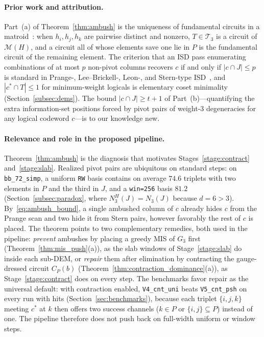 \documentclass[12pt]{article}
\theoremstyle{definition}
\newcommand{\Tc}{\mathcal{T}_3}
\newcommand{\ttt}[1]{\texttt{#1}}
\begin{document}
\paragraph{Prior work and attribution.}
Part~(a) of Theorem~\ref{thm:ambush} is the uniqueness of fundamental circuits in a
matroid~\cite[Cor.~1.2.6]{Oxley2011}: when $h_i, h_j, h_k$ are pairwise distinct and nonzero, $T \in \Tc$ is a
circuit of $\mathcal{M}(H)$, and a circuit all of whose elements save one lie in $P$ is the fundamental circuit of
the remaining element. The criterion that an ISD pass enumerating combinations of at most $p$ non-pivot columns
recovers $c$ if and only if $|c \cap J| \le p$ is standard in Prange-, Lee--Brickell-, Leon-, and Stern-type
ISD~\cite{Prange1962,LeeBrickell1988,Leon1988,Stern1988}, and $|c^* \cap T| \le 1$ for minimum-weight logicals is
elementary coset minimality (Section~\ref{subsec:dems}). The bound $|c \cap J| \ge t + 1$ of Part~(b)---quantifying
the extra information-set positions forced by pivot pairs of weight-3 degeneracies for any logical codeword $c$---is
to our knowledge new.

\paragraph{Relevance and role in the proposed pipeline.}
Theorem~\ref{thm:ambush} is the diagnosis that motivates Stages~\ref{stage:contract} and~\ref{stage:slab}. Realized
pivot pairs are ubiquitous on standard steps: on \ttt{bb\_72\_simp}, a uniform \ttt{RW} basis contains on average
$74.6$ triplets with two elements in $P$ and the third in $J$, and a \ttt{win=256} basis $81.2$
(Section~\ref{subsec:paradox}, where $N_3^H(J) = N_3(J)$ because $d = 6 > 3$). By~\eqref{eq:ambush_bound}, a single
ambushed column of $c$ already hides $c$ from the Prange scan and two hide it from Stern pairs, however favorably the
rest of $c$ is placed. The theorem points to two complementary remedies, both used in the pipeline: \emph{prevent}
ambushes by placing a greedy MIS of $G_3$ first (Theorem~\ref{thm:mis_push}(a)), as the slab windows of
Stage~\ref{stage:slab} do inside each sub-DEM, or \emph{repair} them after elimination by contracting the
gauge-dressed circuit $C_P(b)$ (Theorem~\ref{thm:contraction_dominance}(a)), as Stage~\ref{stage:contract} does on
every step. The benchmarks favor repair as the universal default: with contraction enabled, \ttt{V4\_cnt\_uni} beats
\ttt{V5\_cnt\_psh} on every run with hits (Section~\ref{sec:benchmarks}), because each triplet $\{i, j, k\}$ meeting
$c^*$ at $k$ then offers two success channels ($k \in P$ or $\{i, j\} \subseteq P$) instead of one. The pipeline
therefore does not push back on full-width uniform or window steps.
\end{document}
